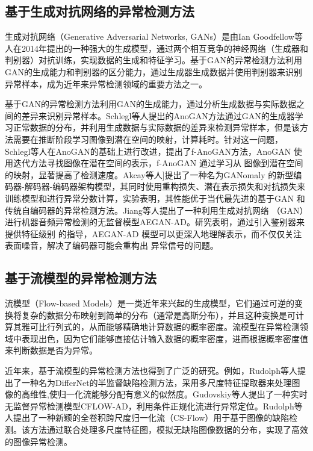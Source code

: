 \documentclass{article}
\begin{document}
\subsection{基于生成对抗网络的异常检测方法}

生成对抗网络（Generative Adversarial Networks, GANs）\cite{GAN}是由Ian Goodfellow等人在2014年提出的一种强大的生成模型，通过两个相互竞争的神经网络（生成器和判别器）对抗训练，实现数据的生成和特征学习。基于GAN的异常检测方法利用GAN的生成能力和判别器的区分能力，通过生成器生成数据并使用判别器来识别异常样本，成为近年来异常检测领域的重要方法之一\cite{GAN-BASED-AD-REVIEW}。

基于GAN的异常检测方法利用GAN的生成能力，通过分析生成数据与实际数据之间的差异来识别异常样本。Schlegl等人提出的AnoGAN\cite{AnoGAN}方法通过GAN的生成器学习正常数据的分布，并利用生成数据与实际数据的差异来检测异常样本，但是该方法需要在推断阶段学习图像到潜在空间的映射，计算耗时。针对这一问题，Schlegl等人\cite{f-AnoGAN}在AnoGAN的基础上进行改进，提出了f-AnoGAN方法，AnoGAN 使用迭代方法寻找图像在潜在空间的表示，f-AnoGAN 通过学习从 图像到潜在空间的映射，显著提高了检测速度。Akcay等人\cite{GANomaly}]提出了一种名为GANomaly 的新型编码器-解码器-编码器架构模型，其同时使用重构损失、潜在表示损失和对抗损失来训练模型和进行异常分数计算，实验表明，其性能优于当代最先进的基于GAN 和传统自编码器的异常检测方法。Jiang等人\cite{AEGAN-AD}提出了一种利用生成对抗网络 （GAN）进行机器音频异常检测的无监督模型AEGAN-AD。研究表明，通过引入鉴别器来提供特征级别 的指导，AEGAN-AD 模型可以更深入地理解表示，而不仅仅关注表面噪音，解决了编码器可能会重构出 异常信号的问题。

\subsection{基于流模型的异常检测方法}

流模型（Flow-based Models）是一类近年来兴起的生成模型，它们通过可逆的变换将复杂的数据分布映射到简单的分布（通常是高斯分布），并且这种变换是可计算其雅可比行列式的，从而能够精确地计算数据的概率密度。流模型在异常检测领域中表现出色，因为它们能够直接估计输入数据的概率密度，进而根据概率密度值来判断数据是否为异常。

近年来，基于流模型的异常检测方法也得到了广泛的研究。例如，Rudolph等人\cite{DifferNet}提出了一种名为DifferNet的半监督缺陷检测方法，采用多尺度特征提取器来处理图像的高维性,使归一化流能够分配有意义的似然度。Gudovskiy等人\cite{CFlow-AD}提出了一种实时无监督异常检测模型CFLOW-AD，利用条件正规化流进行异常定位。Rudolph等人\cite{CSFlow}提出了一种新颖的全卷积跨尺度归一化流（CS-Flow）用于基于图像的缺陷检测。该方法通过联合处理多尺度特征图，模拟无缺陷图像数据的分布，实现了高效的图像异常检测。
\end{document}
